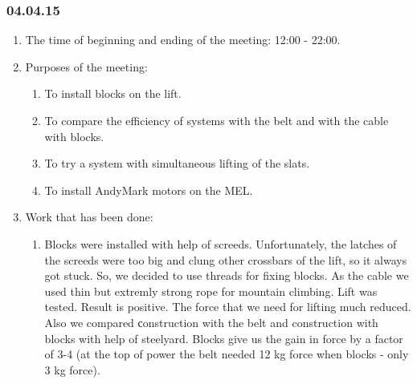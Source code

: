\subsubsection{04.04.15}
\begin{enumerate}
	
	\item The time of beginning and ending of the meeting: 12:00 - 22:00.
	
	\item Purposes of the meeting: 
	\begin{enumerate}
		
		\item To install blocks on the lift.
		
		\item To compare the efficiency of systems with the belt and with the cable with blocks.
		
		\item To try a system with simultaneous lifting of the slats.
		
        \item To install AndyMark motors on the MEL.
		
	\end{enumerate}

	\item Work that has been done:
	\begin{enumerate}
		
		\item Blocks were installed with help of screeds. Unfortunately, the latches of the screeds were too big and clung other crossbars of the lift, so it always got stuck. So, we decided to use threads for fixing blocks. As the cable we used thin but extremly strong rope for mountain climbing. Lift was tested. Result is positive. The force that we need for lifting much reduced. Also we compared сonstruction with the belt and construction with blocks with help of steelyard. Blocks give us the gain in force by a factor of 3-4 (at the top of power the belt needed 12 kg force when blocks - only 3 kg force). 
		\begin{figure}[H]
			\begin{minipage}[h]{0.2\linewidth}
				\center  
			\end{minipage}
			\begin{minipage}[h]{0.6\linewidth}
				\caption{}
			\end{minipage}
		\end{figure} 
		

\end{enumerate}
\end{enumerate}
